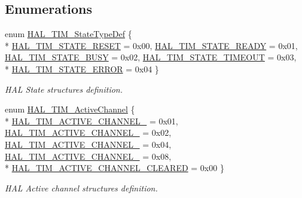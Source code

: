 \subsection*{Enumerations}
\begin{DoxyCompactItemize}
\item 
enum \hyperlink{group___t_i_m___exported___types_gae0994cf5970e56ca4903e9151f40010c}{H\+A\+L\+\_\+\+T\+I\+M\+\_\+\+State\+Type\+Def} \{ \\*
\hyperlink{group___t_i_m___exported___types_ggae0994cf5970e56ca4903e9151f40010ca28011b79e60b74a6c55947c505c51cbc}{H\+A\+L\+\_\+\+T\+I\+M\+\_\+\+S\+T\+A\+T\+E\+\_\+\+R\+E\+S\+ET} = 0x00, 
\hyperlink{group___t_i_m___exported___types_ggae0994cf5970e56ca4903e9151f40010ca4545554d7fa04d17e78d69d17cb7e4b3}{H\+A\+L\+\_\+\+T\+I\+M\+\_\+\+S\+T\+A\+T\+E\+\_\+\+R\+E\+A\+DY} = 0x01, 
\hyperlink{group___t_i_m___exported___types_ggae0994cf5970e56ca4903e9151f40010ca1ddbfef19ad0562eb8143919b710cc12}{H\+A\+L\+\_\+\+T\+I\+M\+\_\+\+S\+T\+A\+T\+E\+\_\+\+B\+U\+SY} = 0x02, 
\hyperlink{group___t_i_m___exported___types_ggae0994cf5970e56ca4903e9151f40010ca03e3339df71a74ac37820f72c2989371}{H\+A\+L\+\_\+\+T\+I\+M\+\_\+\+S\+T\+A\+T\+E\+\_\+\+T\+I\+M\+E\+O\+UT} = 0x03, 
\\*
\hyperlink{group___t_i_m___exported___types_ggae0994cf5970e56ca4903e9151f40010ca318cceb243cb9ca9e01833913e4f90ea}{H\+A\+L\+\_\+\+T\+I\+M\+\_\+\+S\+T\+A\+T\+E\+\_\+\+E\+R\+R\+OR} = 0x04
 \}\begin{DoxyCompactList}\small\item\em H\+AL State structures definition. \end{DoxyCompactList}
\item 
enum \hyperlink{group___t_i_m___exported___types_gaa3fa7bcbb4707f1151ccfc90a8cf9706}{H\+A\+L\+\_\+\+T\+I\+M\+\_\+\+Active\+Channel} \{ \\*
\hyperlink{group___t_i_m___exported___types_ggaa3fa7bcbb4707f1151ccfc90a8cf9706a2024e95c48b58ec9b2115faa276e3fad}{H\+A\+L\+\_\+\+T\+I\+M\+\_\+\+A\+C\+T\+I\+V\+E\+\_\+\+C\+H\+A\+N\+N\+E\+L\+\_} = 0x01, 
\hyperlink{group___t_i_m___exported___types_ggaa3fa7bcbb4707f1151ccfc90a8cf9706ae80e6a1dd1c479f504219c0fec2f3322}{H\+A\+L\+\_\+\+T\+I\+M\+\_\+\+A\+C\+T\+I\+V\+E\+\_\+\+C\+H\+A\+N\+N\+E\+L\+\_} = 0x02, 
\hyperlink{group___t_i_m___exported___types_ggaa3fa7bcbb4707f1151ccfc90a8cf9706acc3fcf4ee6d91744c4bc6a5eccde2601}{H\+A\+L\+\_\+\+T\+I\+M\+\_\+\+A\+C\+T\+I\+V\+E\+\_\+\+C\+H\+A\+N\+N\+E\+L\+\_} = 0x04, 
\hyperlink{group___t_i_m___exported___types_ggaa3fa7bcbb4707f1151ccfc90a8cf9706a7d98ec7e385cacb3aaa6cec601fa6ab6}{H\+A\+L\+\_\+\+T\+I\+M\+\_\+\+A\+C\+T\+I\+V\+E\+\_\+\+C\+H\+A\+N\+N\+E\+L\+\_} = 0x08, 
\\*
\hyperlink{group___t_i_m___exported___types_ggaa3fa7bcbb4707f1151ccfc90a8cf9706a574f72ac3bb41fe660318aa42dfdc98d}{H\+A\+L\+\_\+\+T\+I\+M\+\_\+\+A\+C\+T\+I\+V\+E\+\_\+\+C\+H\+A\+N\+N\+E\+L\+\_\+\+C\+L\+E\+A\+R\+ED} = 0x00
 \}\begin{DoxyCompactList}\small\item\em H\+AL Active channel structures definition. \end{DoxyCompactList}
\end{DoxyCompactItemize}


